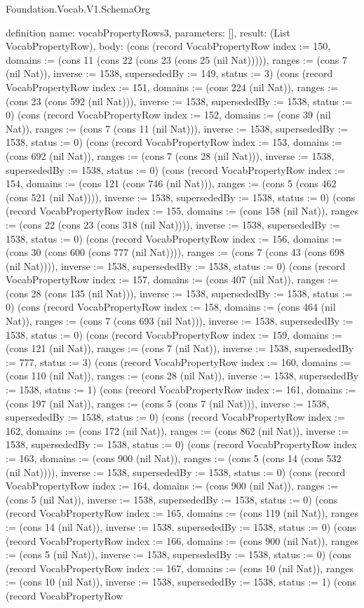 \begin{lexlean}{Foundation.Vocab.V1.SchemaOrg}
\begin{semanticmodule}
definition{
  name: vocabPropertyRows3,
  parameters: [],
  result: (List VocabPropertyRow),
  body: (cons (record VocabPropertyRow {index := 150, domains := (cons 11 (cons 22 (cons 23 (cons 25 (nil Nat))))), ranges := (cons 7 (nil Nat)), inverse := 1538, supersededBy := 149, status := 3}) (cons (record VocabPropertyRow {index := 151, domains := (cons 224 (nil Nat)), ranges := (cons 23 (cons 592 (nil Nat))), inverse := 1538, supersededBy := 1538, status := 0}) (cons (record VocabPropertyRow {index := 152, domains := (cons 39 (nil Nat)), ranges := (cons 7 (cons 11 (nil Nat))), inverse := 1538, supersededBy := 1538, status := 0}) (cons (record VocabPropertyRow {index := 153, domains := (cons 692 (nil Nat)), ranges := (cons 7 (cons 28 (nil Nat))), inverse := 1538, supersededBy := 1538, status := 0}) (cons (record VocabPropertyRow {index := 154, domains := (cons 121 (cons 746 (nil Nat))), ranges := (cons 5 (cons 462 (cons 521 (nil Nat)))), inverse := 1538, supersededBy := 1538, status := 0}) (cons (record VocabPropertyRow {index := 155, domains := (cons 158 (nil Nat)), ranges := (cons 22 (cons 23 (cons 318 (nil Nat)))), inverse := 1538, supersededBy := 1538, status := 0}) (cons (record VocabPropertyRow {index := 156, domains := (cons 30 (cons 600 (cons 777 (nil Nat)))), ranges := (cons 7 (cons 43 (cons 698 (nil Nat)))), inverse := 1538, supersededBy := 1538, status := 0}) (cons (record VocabPropertyRow {index := 157, domains := (cons 407 (nil Nat)), ranges := (cons 28 (cons 135 (nil Nat))), inverse := 1538, supersededBy := 1538, status := 0}) (cons (record VocabPropertyRow {index := 158, domains := (cons 464 (nil Nat)), ranges := (cons 7 (cons 693 (nil Nat))), inverse := 1538, supersededBy := 1538, status := 0}) (cons (record VocabPropertyRow {index := 159, domains := (cons 121 (nil Nat)), ranges := (cons 7 (nil Nat)), inverse := 1538, supersededBy := 777, status := 3}) (cons (record VocabPropertyRow {index := 160, domains := (cons 110 (nil Nat)), ranges := (cons 28 (nil Nat)), inverse := 1538, supersededBy := 1538, status := 1}) (cons (record VocabPropertyRow {index := 161, domains := (cons 197 (nil Nat)), ranges := (cons 5 (cons 7 (nil Nat))), inverse := 1538, supersededBy := 1538, status := 0}) (cons (record VocabPropertyRow {index := 162, domains := (cons 172 (nil Nat)), ranges := (cons 862 (nil Nat)), inverse := 1538, supersededBy := 1538, status := 0}) (cons (record VocabPropertyRow {index := 163, domains := (cons 900 (nil Nat)), ranges := (cons 5 (cons 14 (cons 532 (nil Nat)))), inverse := 1538, supersededBy := 1538, status := 0}) (cons (record VocabPropertyRow {index := 164, domains := (cons 900 (nil Nat)), ranges := (cons 5 (nil Nat)), inverse := 1538, supersededBy := 1538, status := 0}) (cons (record VocabPropertyRow {index := 165, domains := (cons 119 (nil Nat)), ranges := (cons 14 (nil Nat)), inverse := 1538, supersededBy := 1538, status := 0}) (cons (record VocabPropertyRow {index := 166, domains := (cons 900 (nil Nat)), ranges := (cons 5 (nil Nat)), inverse := 1538, supersededBy := 1538, status := 0}) (cons (record VocabPropertyRow {index := 167, domains := (cons 10 (nil Nat)), ranges := (cons 10 (nil Nat)), inverse := 1538, supersededBy := 1538, status := 1}) (cons (record VocabPropertyRow }
\end{semanticmodule}
\end{lexlean}
